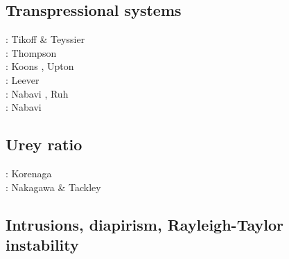 \subsection{Transpressional systems} 

\begin{scriptsize}
\nineteenninetyfour: Tikoff \& Teyssier \cite{tite94}\\
\nineteenninetyseven: Thompson \etal \cite{thsj97}\\
\twothousandthree: Koons \etal \cite{konc03}, Upton \etal \cite{upke03}\\
\twothousandeleven: Leever \etal \cite{legs11}\\
\twothousandseventeen: Nabavi \etal \cite{naam17}, Ruh \etal \cite{rugb17}\\
\twothousandeighteen: Nabavi \etal \cite{naam18}
\end{scriptsize}

\subsection{Urey ratio}

\begin{scriptsize}
\twothousandeight: Korenaga \cite{kore08}\\
\twothousandtwelve: Nakagawa \& Tackley \cite{nata12}
\end{scriptsize}

\subsection{Intrusions, diapirism, Rayleigh-Taylor instability}

